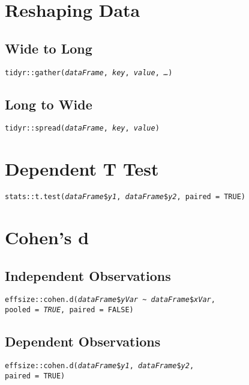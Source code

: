 \documentclass{tufte-handout}
\newenvironment{subs}
  {\adjustwidth{3em}{0pt}}
  {\endadjustwidth}
\begin{document}
\section{Reshaping Data}
\begin{subs}
\subsection{Wide to Long}
\noindent \texttt{tidyr::}{\color{red}\texttt{gather}}\texttt{(\textit{dataFrame}, \textit{key}, \textit{value}, \textit{\ldots})}\\

\vspace{3mm}
\subsection{Long to Wide}
\noindent \texttt{tidyr::}{\color{red}\texttt{spread}}\texttt{(\textit{dataFrame}, \textit{key}, \textit{value})}\\
\end{subs}

\vspace{5mm}
\section{Dependent T Test}
\noindent \texttt{stats::}{\color{red}\texttt{t.test}}\texttt{(\textit{dataFrame}\$\textit{y1}, \textit{dataFrame}\$\textit{y2}, paired = TRUE)}\\

\vspace{5mm}
\section{Cohen's d}
\begin{subs}
\subsection{Independent Observations}
\noindent \texttt{effsize::}{\color{red}\texttt{cohen.d}}\texttt{(\textit{dataFrame}\$\textit{yVar} \textasciitilde\ \textit{dataFrame}\$\textit{xVar}, \\ pooled = \textit{TRUE}, paired = FALSE)}\\

\vspace{3mm}
\subsection{Dependent Observations}
\noindent \texttt{effsize::}{\color{red}\texttt{cohen.d}}\texttt{(\textit{dataFrame}\$\textit{y1}, \textit{dataFrame}\$\textit{y2}, \\ paired = TRUE)}\\
\end{subs}
\end{document}
